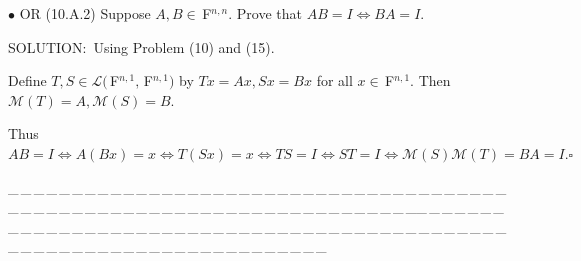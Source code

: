 \documentclass[a4paper, 11pt, UTF8]{article}
\def\Lm{\mathcal{L}}
\def\Mt{\mathcal{M}}
\def\Fbfc{$\,{\timesbf F}$}
\begin{document}
\begin{large}
{\small $\bullet$ } O{\small R} (10.A.2) {\timessl\Large 
Suppose $A,B\in\Fbfc^{n,n}$. Prove that $AB = I\Longleftrightarrow BA=I$.
}\par
{\timesbf S\footnotesize{OLUTION:}}\,\,\,Using Problem (10) and (15).\par\quad
Define $T,S\in\Lm(\Fbfc^{n,1},\Fbfc^{n,1})$ by $Tx=Ax,Sx=Bx$ for all $x\in\Fbfc^{n,1}$. Then $\Mt(T)=A,\Mt(S)=B.$\par\quad
Thus $AB=I\Leftrightarrow A(Bx)=x\Longleftrightarrow T(Sx)=x\Leftrightarrow TS=I\Longleftrightarrow ST=I\Longleftrightarrow \Mt(S)\Mt(T)=BA=I.\square$
\par
{\tiny \_\,\_\,\_\,\_\,\_\,\_\,\_\,\_\,\_\,\_\,\_\,\_\,\_\,\_\,\_\,\_\,\_\,\_\,\_\,\_\,\_\,\_\,\_\,\_\,\_\,\_\,\_\,\_\,\_\,\_\,\_\,\_\,\_\,\_\,\_\,\_\,\_\,\_\,\_\,\_\,\_\,\_\,\_\,\_\,\_\,\_\,\_\,\_\,\_\,\_\,\_\,\_\,\_\,\_\,\_\,\_\,\_\,\_\,\_\,\_\,\_\,\_\,\_\,\_\,\_\,\_\,\_\,\_\,\_\,\_\,\_\_\,\_\,\_\,\_\,\_\,\_\,\_\,\_\,\_\,\_\,\_\,\_\,\_\,\_\,\_\,\_\,\_\,\_\,\_\,\_\,\_\,\_\,\_\,\_\,\_\,\_\,\_\,\_\,\_\,\_\,\_\,\_\,\_\,\_\,\_\,\_\,\_\,\_\,\_\,\_\,\_\,\_\,\_\,\_\,\_\,\_\,\_\,\_\,\_\,\_\,\_\,\_\,\_\,\_\,\_\,\_\,\_\,\_\,\_\,\_\,\_\,\_\,\_\,\_\,\_\,\_\,\_\,\_\,\_\,\_\,\_}\par


\end{large}
\end{document}
